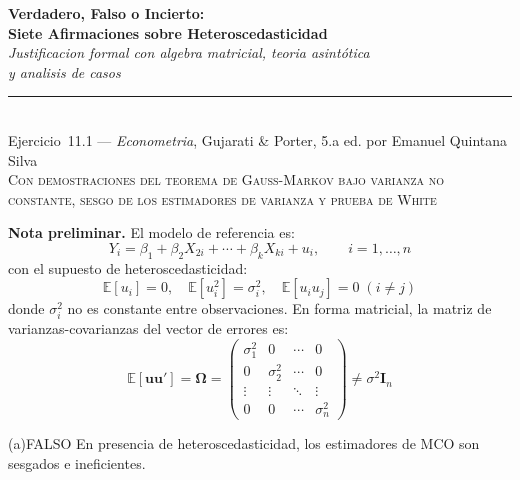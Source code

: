 \documentclass[12pt, letterpaper]{article}
\theoremstyle{remark}
\newcommand{\E}{\mathbb{E}}
\begin{document}
\begin{center}
  {\LARGE\bfseries Verdadero, Falso o Incierto:}\\[6pt]
  {\LARGE\bfseries Siete Afirmaciones sobre Heteroscedasticidad}\\[12pt]
  {\large\itshape Justificacion formal con algebra matricial, teoria asintótica}\\
  {\large\itshape y analisis de casos}\\[14pt]
  \rule{0.55\linewidth}{0.6pt}\\[8pt]
  {\normalsize Ejercicio~11.1 --- \textit{Econometria}, Gujarati \& Porter, 5.a ed. por Emanuel Quintana Silva}\\[4pt]
  {\small\textsc{Con demostraciones del teorema de Gauss-Markov bajo varianza no constante,
  sesgo de los estimadores de varianza y prueba de White}}
\end{center}

\vspace{10pt}

\noindent\textbf{Nota preliminar.}\quad
El modelo de referencia es:
\begin{equation}
  Y_i = \beta_1 + \beta_2 X_{2i} + \cdots + \beta_k X_{ki} + u_i,
  \qquad i = 1, \ldots, n
  \label{eq:modelo}
\end{equation}
con el supuesto de heteroscedasticidad:
\begin{equation}
  \E[u_i] = 0, \quad \E[u_i^2] = \sigma_i^2, \quad \E[u_i u_j] = 0 \; (i \neq j)
  \label{eq:heterosc}
\end{equation}
donde $\sigma_i^2$ no es constante entre observaciones. En forma matricial,
la matriz de varianzas-covarianzas del vector de errores es:
\begin{equation}
  \E[\mathbf{u}\mathbf{u}'] = \boldsymbol\Omega =
  \begin{pmatrix}
    \sigma_1^2 & 0 & \cdots & 0\\
    0 & \sigma_2^2 & \cdots & 0\\
    \vdots & \vdots & \ddots & \vdots\\
    0 & 0 & \cdots & \sigma_n^2
  \end{pmatrix}
  \neq \sigma^2 \mathbf{I}_n
  \label{eq:Omega}
\end{equation}

\bigskip

\begin{verdict}{(a)}{FALSO}
  En presencia de heteroscedasticidad, los estimadores de MCO son sesgados e
  ineficientes.
\end{verdict}
\end{document}
